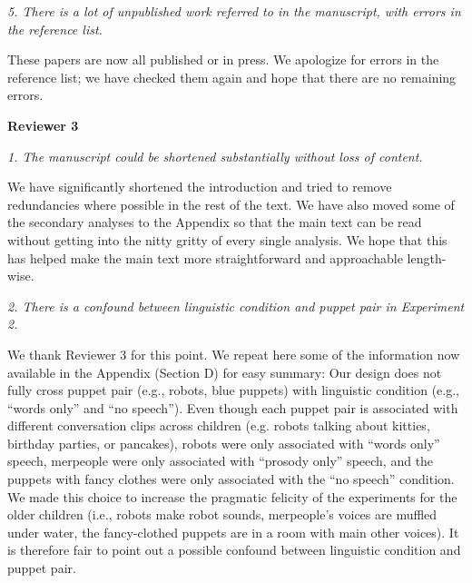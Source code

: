 \documentclass[11pt,a4paper]{letter} %
\begin{document}
\begin{letter}{}
\smallskip

\noindent \textit{5. There is a lot of unpublished work referred to in the manuscript, with errors in the reference list.}

\noindent These papers are now all published or in press. We apologize for errors in the reference list; we have checked them again and hope that there are no remaining errors.

\bigskip

\noindent \textbf{Reviewer 3}

\noindent \textit{1. The manuscript could be shortened substantially without loss of content.}

\noindent We have significantly shortened the introduction and tried to remove redundancies where possible in the rest of the text. We have also moved some of the secondary analyses to the Appendix so that the main text can be read without getting into the nitty gritty of every single analysis. We hope that this has helped make the main text more straightforward and approachable length-wise.

\smallskip

\noindent \textit{2. There is a confound between linguistic condition and puppet pair in Experiment 2.}

\noindent We thank Reviewer 3 for this point. We repeat here some of the information now available in the Appendix (Section D) for easy summary: Our design does not fully cross puppet pair (e.g., robots, blue puppets) with linguistic condition (e.g., ``words only'' and ``no speech''). Even though each puppet pair is associated with different conversation clips across children (e.g. robots talking about kitties, birthday parties, or pancakes), robots were only associated with ``words only'' speech, merpeople were only associated with ``prosody only'' speech, and the puppets with fancy clothes were only associated with the ``no speech'' condition. We made this choice to increase the pragmatic felicity of the experiments for the older children (i.e., robots make robot sounds, merpeople's voices are muffled under water, the fancy-clothed puppets are in a room with main other voices). It is therefore fair to point out a possible confound between linguistic condition and puppet pair. 


\end{letter}
\end{document}
